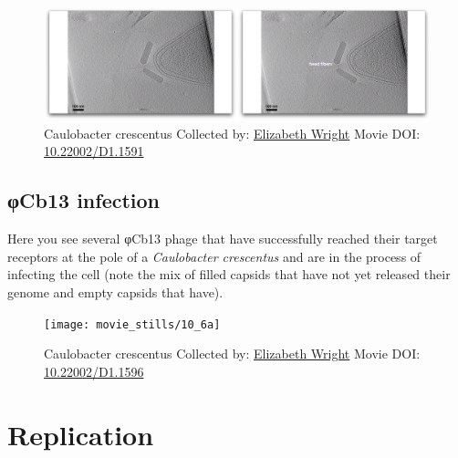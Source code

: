 \documentclass[]{tufte-book}
\begin{document}
\begin{figure}
\includegraphics{movie_stills/10_6} \caption[Caulobacter crescentus Collected by:
\protect\hyperlink{elizabeth_wright}{Elizabeth Wright} Movie DOI:
\href{https://doi.org/10.22002/D1.1591}{10.22002/D1.1591}]{Caulobacter crescentus Collected by:
\protect\hyperlink{elizabeth_wright}{Elizabeth Wright} Movie DOI:
\href{https://doi.org/10.22002/D1.1591}{10.22002/D1.1591}}\label{fig:10-6}
\end{figure}

\hypertarget{ux3c6Cb13_infection}{\subsection{φCb13
infection}\label{ux3c6Cb13_infection}}

Here you see several φCb13 phage that have successfully reached their
target receptors at the pole of a \emph{Caulobacter crescentus} and are
in the process of infecting the cell (note the mix of filled capsids
that have not yet released their genome and empty capsids that have).





\begin{figure}
\texttt{[image: movie\_stills/10\_6a]} \caption[Caulobacter crescentus Collected by:
\protect\hyperlink{elizabeth_wright}{Elizabeth Wright} Movie DOI:
\href{https://doi.org/10.22002/D1.1596}{10.22002/D1.1596}]{Caulobacter crescentus Collected by:
\protect\hyperlink{elizabeth_wright}{Elizabeth Wright} Movie DOI:
\href{https://doi.org/10.22002/D1.1596}{10.22002/D1.1596}}\label{fig:10-6a}
\end{figure}

\section{Replication}\label{replication}
\end{document}
